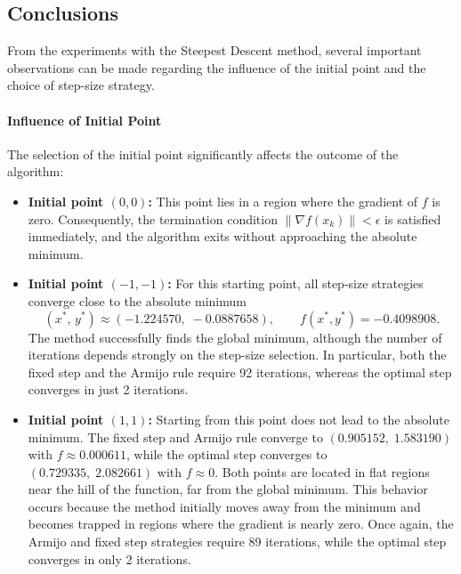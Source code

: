 \documentclass[11pt]{article}
\begin{document}
\newpage
\subsection{Conclusions}

From the experiments with the Steepest Descent method, several important observations can be made regarding the influence of the initial point and the choice of step-size strategy.

\paragraph{Influence of Initial Point} The selection of the initial point significantly affects the outcome of the algorithm:
\begin{itemize}
    \item \textbf{Initial point $(0,0)$:} This point lies in a region where the gradient of $f$ is zero. Consequently, the termination condition $\|\nabla f(x_k)\| < \epsilon$ is satisfied immediately, and the algorithm exits without approaching the absolute minimum.
    
    \item \textbf{Initial point $(-1,-1)$:} For this starting point, all step-size strategies converge close to the absolute minimum
    \[
    (x^*,\, y^*) \approx (-1.224570,\; -0.0887658), \qquad f(x^*,y^*) = -0.4098908.
    \]
    The method successfully finds the global minimum, although the number of iterations depends strongly on the step-size selection. In particular, both the fixed step and the Armijo rule require 92 iterations, whereas the optimal step converges in just 2 iterations.
    
    \item \textbf{Initial point $(1,1)$:} Starting from this point does not lead to the absolute minimum. The fixed step and Armijo rule converge to $(0.905152,\;1.583190)$ with $f \approx 0.000611$, while the optimal step converges to $(0.729335,\;2.082661)$ with $f \approx 0$. Both points are located in flat regions near the hill of the function, far from the global minimum. This behavior occurs because the method initially moves away from the minimum and becomes trapped in regions where the gradient is nearly zero. Once again, the Armijo and fixed step strategies require 89 iterations, while the optimal step converges in only 2 iterations.
\end{itemize}
\end{document}
